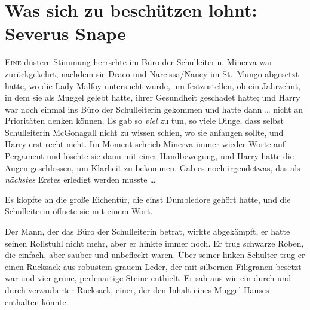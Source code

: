 \chapter{Was sich zu beschützen lohnt: Severus Snape}

\lettrine{E}{ine} düstere Stimmung herrschte im Büro der Schulleiterin. Minerva war zurückgekehrt, nachdem sie Draco und Narcissa/Nancy im St.~Mungo abgesetzt hatte, wo die Lady Malfoy untersucht wurde, um festzustellen, ob ein Jahrzehnt, in dem sie als Muggel gelebt hatte, ihrer Gesundheit geschadet hatte; und Harry war noch einmal ins Büro der Schulleiterin gekommen und hatte dann … nicht an Prioritäten denken können. Es gab so \emph{viel} zu tun, so viele Dinge, dass selbst Schulleiterin McGonagall nicht zu wissen schien, wo sie anfangen sollte, und Harry erst recht nicht. Im Moment schrieb Minerva immer wieder Worte auf Pergament und löschte sie dann mit einer Handbewegung, und Harry hatte die Augen geschlossen, um Klarheit zu bekommen. Gab es noch irgendetwas, das als \emph{nächstes} Erstes erledigt werden musste …

Es klopfte an die große Eichentür, die einst Dumbledore gehört hatte, und die Schulleiterin öffnete sie mit einem Wort.

Der Mann, der das Büro der Schulleiterin betrat, wirkte abgekämpft, er hatte seinen Rollstuhl nicht mehr, aber er hinkte immer noch. Er trug schwarze Roben, die einfach, aber sauber und unbefleckt waren. Über seiner linken Schulter trug er einen Rucksack aus robustem grauem Leder, der mit silbernen Filigranen besetzt war und vier grüne, perlenartige Steine enthielt. Er sah aus wie ein durch und durch verzauberter Rucksack, einer, der den Inhalt eines Muggel-Hauses enthalten könnte.

